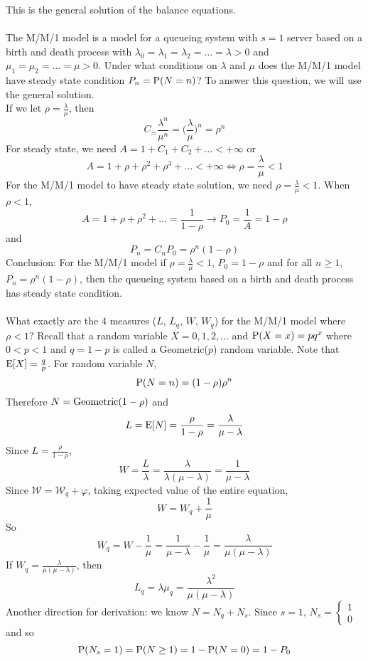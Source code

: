 \documentclass[12pt]{article}
\begin{document}
This is the general solution of the balance equations. \\~\\
The M/M/1 model is a model for a queueing system with $s=1$ server based on a birth and death process with $\lambda_0 = \lambda_1 = \lambda_2 = \dots = \lambda > 0$ and $\mu_1 = \mu_2 = \dots = \mu > 0$. Under what conditions on $\lambda$ and $\mu$ does the M/M/1 model have steady state condition $P_n = \mathrm{P}( N = n )$? To answer this question, we  will use the general solution. \\
If we let $\rho = \frac{\lambda}{\mu}$, then $$C_ = \frac{\lambda^n}{\mu^n} = \Big( \frac{\lambda}{\mu} \Big)^n = \rho^n $$ 
For steady state, we need $A = 1 + C_1 + C_2 + \dots < +\infty$ or 
$$A = 1 + \rho + \rho^2 + \rho^3 + \dots < +\infty \iff \rho = \frac{\lambda}{\mu} < 1 $$ 
For the M/M/1 model to have steady state solution, we need $\rho = \frac{\lambda}{\mu} < 1$. When $\rho < 1$,
$$A = 1 + \rho + \rho^2 + \dots  = \frac{1}{1-\rho} \to P_0 = \frac{1}{A} = 1 - \rho $$ 
and $$P_n = C_nP_0 = \rho^n(1-\rho) $$ 
Conclusion: For the M/M/1 model if $\rho = \frac{\lambda}{\mu} < 1$, $P_0 = 1 - \rho $ and for all $n \geq 1$, $P_n = \rho^n(1-\rho)$, then the queueing system based on a birth and death process has steady state condition. \\~\\
What exactly are the $4$ measures ($L$, $L_q$, $W$, $W_q$) for the M/M/1 model where $\rho < 1$? Recall that a random variable $X = 0,1,2,\dots$ and $\mathrm{P}( X = x ) = pq^x$ where $0 < p < 1$ and $q = 1-p$ is called a Geometric($p$) random variable. Note that $\mathrm{E}[ X ] = \frac{q}{p}$. For random variable $N$, $$\mathrm{P}( N = n )  =(1-\rho)\rho^n$$
Therefore $N = \text{Geometric}( 1-\rho )$ and $$L = \mathrm{E}[ N ] = \frac{\rho}{1-\rho} = \frac{\lambda}{\mu - \lambda} $$ 
Since $L = \frac{\rho}{1-\rho}$, $$ W = \frac{L}{\lambda} = \frac{\lambda}{\lambda(\mu - \lambda)} = \frac{1}{\mu - \lambda}$$ 
Since $\mathcal{W} = \mathcal{W}_q + \varphi$, taking expected value of the entire equation, $$ W = W_q + \frac{1}{\mu} $$ 
So $$W_q = W - \frac{1}{\mu} = \frac{1}{\mu - \lambda} - \frac{1}{\mu} = \frac{\lambda}{\mu(\mu - \lambda)} $$ 
If $W_q = \frac{\lambda}{\mu(\mu - \lambda)}$, then $$L_q = \lambda\mu_q = \frac{\lambda^2}{\mu(\mu - \lambda)} $$ 
Another direction for derivation: we know $N = N_q + N_s$. Since $s=1$, $N_s = \begin{cases} 1 \\ 0 \end{cases}$ and so 
$$ \mathrm{P}( N_s = 1 ) = \mathrm{P}( N \geq 1 ) = 1 - \mathrm{P}( N = 0 ) = 1 - P_0 $$ 
\end{document}
